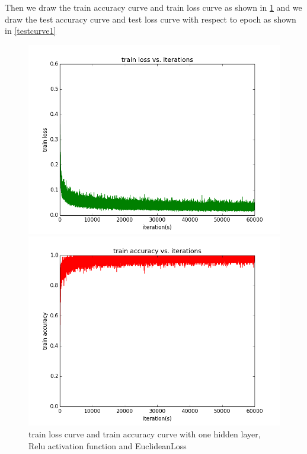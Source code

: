 \documentclass{elegantbook}
\begin{document}
Then we draw the train accuracy curve and train loss curve as shown in \ref{traincurve1} and we draw the test accuracy curve and test loss curve with respect to epoch as shown in \ref{testcurve1}
\begin{figure}[!ht]
	\centering
	\begin{minipage}[t]{0.45\textwidth}
		\centering
		\includegraphics[width=\textwidth]{trainloss1re}
	\end{minipage}
	\begin{minipage}[t]{0.45\textwidth}
		\centering
		\includegraphics[width=\textwidth]{trainacc1re}
	\end{minipage}
	\caption{\label{traincurve1}train loss curve and train accuracy curve with one hidden layer, Relu activation function and EuclideanLoss}
\end{figure}
\end{document}
